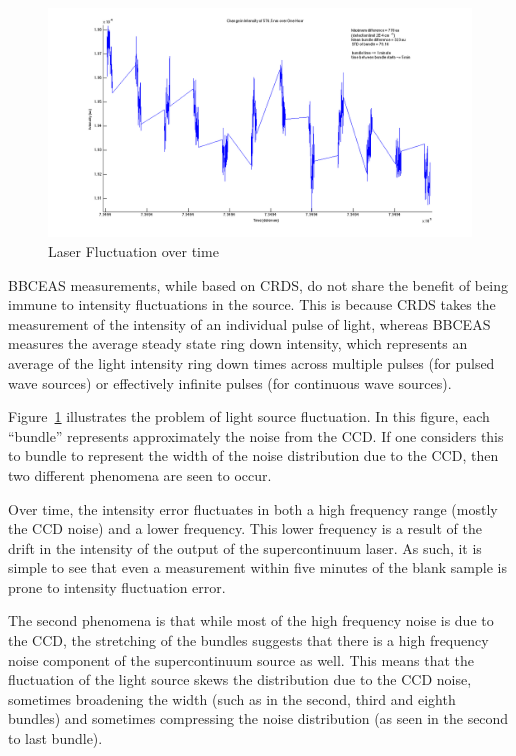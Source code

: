 \begin{figure}[h!]
\begin{center}
\includegraphics[width=\textwidth]{figures/change_in_intensity_of_576_5nm_over_one_hour.png}
\end{center}
\caption{Laser Fluctuation over time}
\label{fig:laser_fluc}
\end{figure}

\ac{BBCEAS} measurements, while based on \ac{CRDS}, do not share the
benefit of being immune to intensity fluctuations in the source. This is
because \ac{CRDS} takes the measurement of the intensity of an individual
pulse of light, whereas \ac{BBCEAS} measures the average steady state ring down
intensity, which represents an average of the light intensity ring down times
across multiple pulses (for pulsed wave sources) or effectively infinite
pulses (for continuous wave sources).

Figure~\ref{fig:laser_fluc} illustrates the problem of light source
fluctuation. In this figure, each ``bundle'' represents approximately the
noise from the \ac{CCD}. If one considers this to bundle to represent the
width of the noise distribution due to the \ac{CCD}, then two different
phenomena are seen to occur.

Over time, the intensity error fluctuates in both a high frequency range
(mostly the \ac{CCD} noise) and a lower frequency. This lower frequency is
a result of the drift in the intensity of the output of the supercontinuum
laser. As such, it is simple to see that even a measurement within five
minutes of the blank sample is prone to intensity fluctuation error.

The second phenomena is that while most of the high frequency noise is due to
the \ac{CCD}, the stretching of the bundles suggests that there is a high
frequency noise component of the supercontinuum source as well. This means
that the fluctuation of the light source skews the distribution due to the
\ac{CCD} noise, sometimes broadening the width (such as in the second, third
and eighth bundles) and sometimes compressing the noise distribution (as seen
in the second to last bundle).

